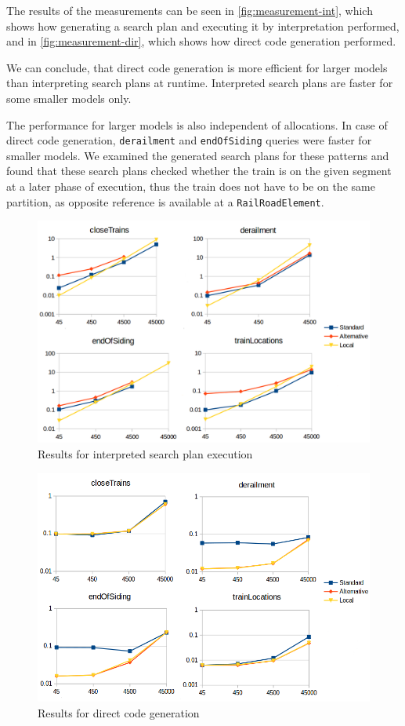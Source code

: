 The results of the measurements can be seen in \autoref{fig:measurement-int}, which shows how generating a search plan and executing it by interpretation performed, and in \autoref{fig:measurement-dir}, which shows how direct code generation performed.

We can conclude, that direct code generation is more efficient for larger models than interpreting search plans at runtime. Interpreted search plans are faster for some smaller models only.

The performance for larger models is also independent of allocations. In case of direct code generation, \texttt{derailment} and \texttt{endOfSiding} queries were faster for smaller models. 
We examined the generated search plans for these patterns and found that these search plans checked whether the train is on the given segment at a later phase of execution, thus the train does not have to be on the same partition, as opposite reference is available at a \texttt{RailRoadElement}.

\pagebreak
\begin{figure}[H]
	\begin{center}
		\includegraphics[width=\textwidth]{figures/measurement-interpreted-code.png}
		\caption{Results for interpreted search plan execution}
		\label{fig:measurement-int}
	\end{center}
\end{figure}

\begin{figure}[H]
	\begin{center}
		\includegraphics[width=\textwidth]{figures/measurement-directcode.png}
		\caption{Results for direct code generation}
		\label{fig:measurement-dir}
	\end{center}
\end{figure}


